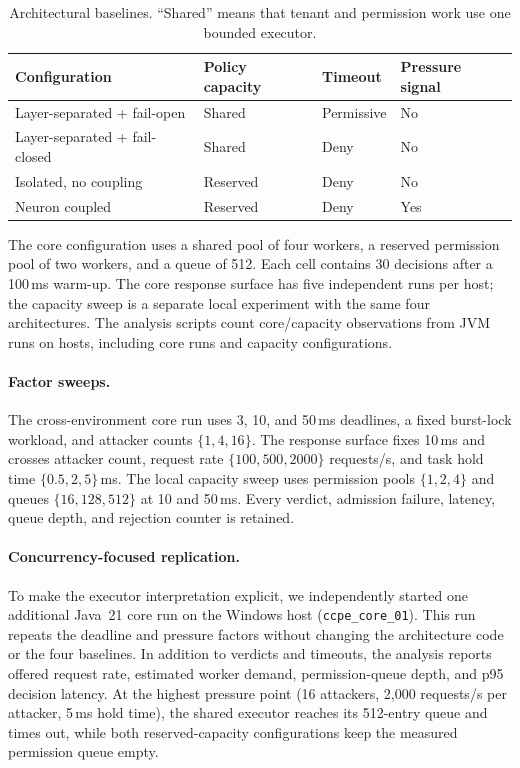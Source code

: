 \begin{table}[t]
\centering
\small
\caption{Architectural baselines. ``Shared'' means that tenant and
permission work use one bounded executor.}
\label{tab:architectures}
\begin{tabular}{llll}
\toprule
Configuration & Policy capacity & Timeout & Pressure signal \\
\midrule
Layer-separated + fail-open   & Shared   & Permissive & No \\
Layer-separated + fail-closed & Shared   & Deny       & No \\
Isolated, no coupling         & Reserved & Deny       & No \\
Neuron coupled                & Reserved & Deny       & Yes \\
\bottomrule
\end{tabular}
\end{table}

The core configuration uses a shared pool of four workers, a reserved
permission pool of two workers, and a queue of 512. Each cell contains 30
decisions after a 100\,ms warm-up. The core response surface has five
independent runs per host; the capacity sweep is a separate local experiment
with the same four architectures. The analysis scripts count
\ComputingObservationCount{} core/capacity observations from
\ComputingRunCount{} JVM runs on \ComputingHostCount{} hosts, including
\ComputingCoreRunCount{} core runs and \ComputingCapacityConfigCount{} capacity
configurations.

\paragraph{Factor sweeps.}
The cross-environment core run uses 3, 10, and 50\,ms deadlines, a fixed
burst-lock workload, and attacker counts $\{1,4,16\}$. The response surface
fixes 10\,ms and crosses attacker count, request rate
$\{100,500,2000\}$ requests/s, and task hold time
$\{0.5,2,5\}$\,ms. The local capacity sweep uses permission pools
$\{1,2,4\}$ and queues $\{16,128,512\}$ at 10 and 50\,ms. Every verdict,
admission failure, latency, queue depth, and rejection counter is retained.

\paragraph{Concurrency-focused replication.}
To make the executor interpretation explicit, we independently started one
additional Java~21 core run on the Windows host (\texttt{ccpe\_core\_01}).
This run repeats the deadline and pressure factors without changing the
architecture code or the four baselines. In addition to verdicts and
timeouts, the analysis reports offered request rate, estimated worker demand,
permission-queue depth, and p95 decision latency. At the highest pressure
point (16 attackers, 2,000 requests/s per attacker, 5\,ms hold time), the
shared executor reaches its 512-entry queue and times out, while both
reserved-capacity configurations keep the measured permission queue empty.

